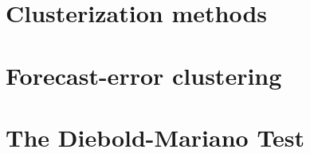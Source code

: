 \documentclass[c, dvipsnames]{beamer}  %
\begin{document}
\section{Clusterization methods}

\section{Forecast-error clustering}


%
%
%
%
%


\section{The Diebold-Mariano Test}


%
%
%
%
%
%
%
%
\end{document}
